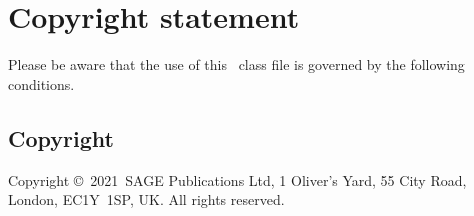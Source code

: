 \documentclass[sagev,times,Review]{sagej}
\def\volumeyear{2021}
\begin{document}

%
%

\section{Copyright statement}
Please  be  aware that the use of  this \LaTeXe\ class file is
governed by the following conditions.

\subsection{Copyright}
Copyright \copyright\ \volumeyear\ SAGE Publications Ltd,
1 Oliver's Yard, 55 City Road, London, EC1Y~1SP, UK. All
rights reserved.
\end{document}

